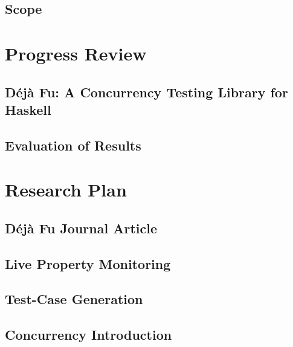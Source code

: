 \documentclass[openright, dottedtoc, headinclude, footinclude=true, a4paper, numbers=noenddot, fontsize=10pt]{scrreprt}
\newcommand{\dejafu}{D\'{e}j\`{a} Fu}
\begin{document}
  \section{Scope}
  \label{sec:intro-scope}
  

\chapter{Progress Review}
\label{chp:progress}


  \section{\dejafu{}: A Concurrency Testing Library for Haskell}
  \label{sec:progress-dejafu}
  

  \section{Evaluation of Results}
  \label{sec:progress-evaluation}
  

\chapter{Research Plan}
\label{chp:plan}


  \section{\dejafu{} Journal Article}
  \label{sec:plan-journal}
  

  \section{Live Property Monitoring}
  \label{sec:plan-ltl}
  

  \section{Test-Case Generation}
  \label{sec:plan-quickspec}
  

  \section{Concurrency Introduction}
  \label{sec:plan-searchparty}
  
\end{document}
